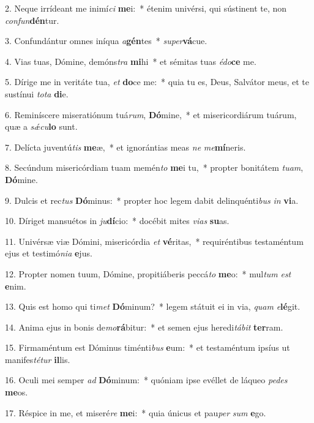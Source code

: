 2. Neque irrídeant me inimí\textit{ci} \textbf{me}i:~*  étenim univérsi, qui sústinent te, non \textit{con}\textit{fun}\textbf{dén}tur.\

3. Confundántur omnes iníqua \textit{a}\textbf{gén}tes~*  \textit{su}\textit{per}\textbf{vá}cue.\

4. Vias tuas, Dómine, demóns\textit{tra} \textbf{mi}hi~*  et sémitas tuas \textit{é}\textit{do}\textbf{ce} me.\

5. Dírige me in veritáte tua, \textit{et} \textbf{do}ce me:~*  quia tu es, Deus, Salvátor meus, et te sustínui \textit{to}\textit{ta} \textbf{di}e.\

6. Reminíscere miseratiónum tuá\textit{rum}, \textbf{Dó}mine,~*  et misericordiárum tuárum, quæ a \textit{sǽ}\textit{cu}\textbf{lo} sunt.\

7. Delícta juventú\textit{tis} \textbf{me}æ,~*  et ignorántias meas \textit{ne} \textit{me}\textbf{mí}neris.\

8. Secúndum misericórdiam tuam memén\textit{to} \textbf{me}i tu,~*  propter bonitátem \textit{tu}\textit{am}, \textbf{Dó}mine.\

9. Dulcis et rec\textit{tus} \textbf{Dó}minus:~*  propter hoc legem dabit delinquénti\textit{bus} \textit{in} \textbf{vi}a.\

10. Díriget mansuétos in \textit{ju}\textbf{dí}cio:~*  docébit mites \textit{vi}\textit{as} \textbf{su}as.\

11. Univérsæ viæ Dómini, misericórdia \textit{et} \textbf{vé}ritas,~*  requiréntibus testaméntum ejus et testimó\textit{ni}\textit{a} \textbf{e}jus.\

12. Propter nomen tuum, Dómine, propitiáberis peccá\textit{to} \textbf{me}o:~*  mul\textit{tum} \textit{est} \textbf{e}nim.\

13. Quis est homo qui ti\textit{met} \textbf{Dó}minum?~*  legem státuit ei in via, \textit{quam} \textit{e}\textbf{lé}git.\

14. Anima ejus in bonis de\textit{mo}\textbf{rá}bitur:~*  et semen ejus heredi\textit{tá}\textit{bit} \textbf{ter}ram.\

15. Firmaméntum est Dóminus timénti\textit{bus} \textbf{e}um:~*  et testaméntum ipsíus ut manifes\textit{té}\textit{tur} \textbf{il}lis.\

16. Oculi mei semper \textit{ad} \textbf{Dó}minum:~*  quóniam ipse evéllet de láqueo \textit{pe}\textit{des} \textbf{me}os.\

17. Réspice in me, et miseré\textit{re} \textbf{me}i:~*  quia únicus et pau\textit{per} \textit{sum} \textbf{e}go.\

